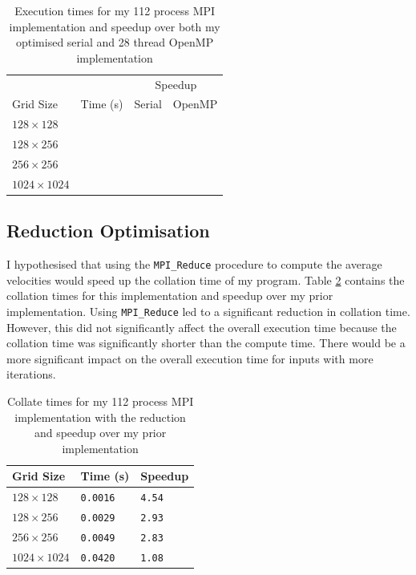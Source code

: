 \documentclass[twocolumn, a4paper]{article}
\begin{document}
\begin{table}[htbp]
  \begin{center}
  \caption{Execution times for my 112 process MPI implementation and speedup over both my optimised serial and 28 thread OpenMP implementation}\label{tab:mpi}
  \begin{tabular}[t]{l | l  l  l} 
      \hline\hline
      &&\multicolumn{2}{c}{Speedup}\\
      \cline{3-4}
      Grid Size&Time (s)&Serial&OpenMP\\
      \hline
      $128 \times 128$&\texttt{}&\texttt{}&\texttt{}\\
      $128 \times 256$&\texttt{}&\texttt{}&\texttt{}\\
      $256 \times 256$&\texttt{}&\texttt{}&\texttt{}\\
      $1024 \times 1024$&\texttt{}&\texttt{}&\texttt{}\\
      \hline
    \end{tabular}
  \end{center}
  \vspace{-1em}
\end{table}

\subsection{Reduction Optimisation}

I hypothesised that using the \texttt{MPI\_Reduce} procedure to compute the average velocities would speed up the collation time of my program.
Table \ref{tab:reduction} contains the collation times for this implementation and speedup over my prior implementation.
Using \texttt{MPI\_Reduce} led to a significant reduction in collation time.
However, this did not significantly affect the overall execution time because the collation time was significantly shorter than the compute time.
There would be a more significant impact on the overall execution time for inputs with more iterations.

\begin{table}[htbp]
  \begin{center}
  \caption{Collate times for my 112 process MPI implementation with the reduction and speedup over my prior implementation}\label{tab:reduction}
  \begin{tabular}[t]{l | l l} 
      \hline\hline
      Grid Size&Time (s)&Speedup\\
      \hline
      $128 \times 128$&\texttt{0.0016}&\texttt{4.54}\\
      $128 \times 256$&\texttt{0.0029}&\texttt{2.93}\\
      $256 \times 256$&\texttt{0.0049}&\texttt{2.83}\\
      $1024 \times 1024$&\texttt{0.0420}&\texttt{1.08}\\
      \hline
    \end{tabular}
  \end{center}
  \vspace{-1em}
\end{table}
\end{document}
